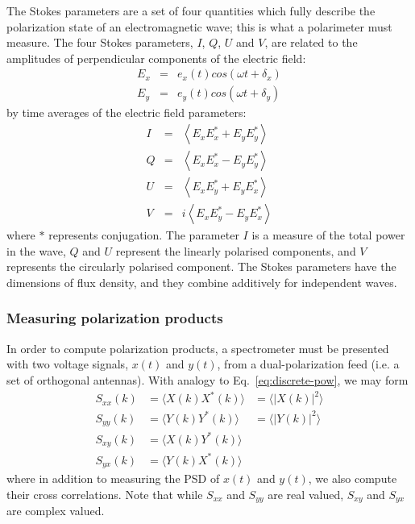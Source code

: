 \documentclass{ws-rv961x669}
\begin{document}
The Stokes parameters are a set of four quantities which fully describe the polarization state of an electromagnetic wave; this is what a polarimeter must measure. The four Stokes parameters, $I$, $Q$, $U$ and $V$, are related to the amplitudes of perpendicular components of the electric field:
\begin{eqnarray}
E_{x} & = & e_{x}(t)cos(\omega t+\delta_{x})\\
E_{y} & = & e_{y}(t)cos(\omega t+\delta_{y})
\end{eqnarray}
by time averages of the electric field parameters:
\begin{eqnarray}
I & = & \left\langle E_{x}E_{x}^{*}+E_{y}E_{y}^{*}\right\rangle \\
Q & = & \left\langle E_{x}E_{x}^{*}-E_{y}E_{y}^{*}\right\rangle \\
U & = & \left\langle E_{x}E_{y}^{*}+E_{y}E_{x}^{*}\right\rangle \\
V & = & i\left\langle E_{x}E_{y}^{*}-E_{y}E_{x}^{*}\right\rangle 
\end{eqnarray}
where $*$ represents conjugation. The parameter $I$ is a measure of the total power in the wave, $Q$ and $U$ represent the linearly polarised components, and $V$ represents the circularly polarised component. The Stokes parameters have the dimensions of flux density, and they combine additively for independent waves.

\subsubsection{Measuring polarization products}

In order to compute polarization products, a spectrometer must be presented with two voltage signals, $x(t)$ and $y(t)$, from a dual-polarization feed (i.e. a set of orthogonal antennas). With analogy to Eq.~\ref{eq:discrete-pow}, we may form 
\begin{eqnarray}
S_{xx}(k) & =  \langle X(k)X^*(k)\rangle  & = \langle |X(k)|^2\rangle \label{eq:sxx1} \\
S_{yy}(k) & =  \langle Y(k)Y^*(k)\rangle  & = \langle |Y(k)|^2\rangle \\
S_{xy}(k) & =  \langle X(k)Y^*(k)\rangle  & \\
S_{yx}(k) & =  \langle Y(k)X^*(k)\rangle  & \label{eq:sxx4}
\end{eqnarray}
where in addition to measuring the PSD of $x(t)$ and $y(t)$, we also compute their cross correlations.  Note that while $S_{xx}$ and $S_{yy}$ are real valued, $S_{xy}$ and $S_{yx}$ are complex valued.
\end{document}
